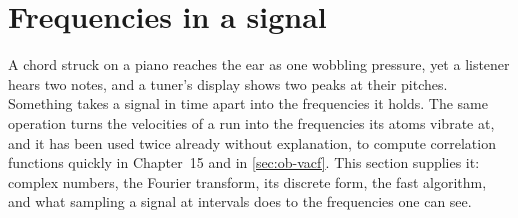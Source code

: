 \section{Frequencies in a signal}
\label{sec:ob-fourier}

A chord struck on a piano reaches the ear as one wobbling pressure, yet a
listener hears two notes, and a tuner's display shows two peaks at their
pitches. Something takes a signal in time apart into the frequencies it
holds. The same operation turns the velocities of a run into the
frequencies its atoms vibrate at, and it has been used twice already
without explanation, to compute correlation functions quickly in
Chapter~15 and in \cref{sec:ob-vacf}. This section supplies it: complex
numbers, the Fourier transform, its discrete form, the fast algorithm,
and what sampling a signal at intervals does to the frequencies one can
see.

